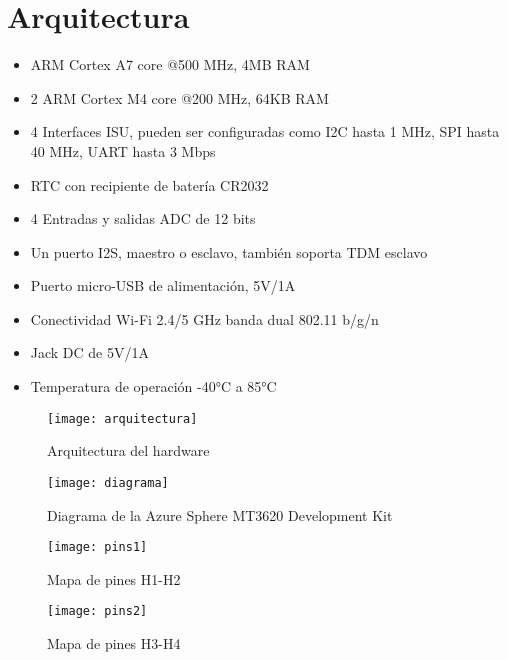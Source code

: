 \section{Arquitectura}
\begin{itemize}
	\item
	ARM Cortex A7 core @500 MHz, 4MB RAM
	\item
	2 ARM Cortex M4 core @200 MHz, 64KB RAM
	\item
	4 Interfaces ISU, pueden ser configuradas como I2C hasta 1 MHz, SPI hasta 40 MHz, UART hasta 3 Mbps
	\item
	RTC con recipiente de batería CR2032
	\item
	4 Entradas y salidas ADC de 12 bits
	\item
	Un puerto I2S, maestro o esclavo, también soporta TDM esclavo
	\item
	Puerto micro-USB de alimentación, 5V/1A
	\item
	Conectividad Wi-Fi 2.4/5 GHz banda dual 802.11 b/g/n
	\item
	Jack DC de 5V/1A
	\item
	Temperatura de operación -40°C a 85°C
\end{itemize}	
\begin{figure}[h]
	\centering
	\texttt{[image: arquitectura]}
	\caption{Arquitectura del hardware}
\end{figure}

\begin{figure}[h]
	\centering
	\texttt{[image: diagrama]}
	\caption{Diagrama de la Azure Sphere MT3620 Development Kit}
\end{figure}

\begin{figure}[h]
	\centering
	\texttt{[image: pins1]}
	\caption{Mapa de pines H1-H2}
\end{figure}

\begin{figure}[h]
	\centering
	\texttt{[image: pins2]}
	\caption{Mapa de pines H3-H4}
\end{figure}
